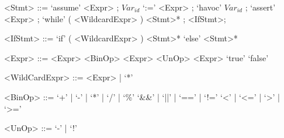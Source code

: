 
\begin{grammar}
	<Stmt> ::= `assume' <Expr> ;
	\alt $Var_{id}$ `:=' <Expr> ;
	\alt `havoc' $Var_{id}$ ;
	\alt `assert' <Expr> ;
	\alt `while' ( <WildcardExpr> ) <Stmt>* ;
	\alt <IfStmt>;
	
	<IfStmt> ::= `if' ( <WildcardExpr> ) <Stmt>* `else' <Stmt>*
	
	<Expr> ::= <Expr> <BinOp> <Expr>
	\alt <UnOp> <Expr>
	\alt `true'
	\alt `false'
	
	<WildCardExpr> ::= <Expr> | `*'
	
	<BinOp> ::= `+' | `-' | `*' | `/' | `\%'
	\alt `\&\&' | `||' | `==' | `!='
	\alt `<' | `<=' | `>' | `>='
	
	<UnOp> ::= `-' | `!'
\end{grammar}